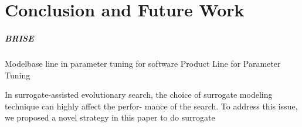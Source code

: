 \chapter{Conclusion and Future Work}\label{sec:conclusion}



         \paragraph{BRISE}
         Modelbase line in parameter tuning for software Product Line for Parameter Tuning




         In surrogate-assisted evolutionary search, the choice of surrogate modeling technique can highly affect the perfor- mance of the search. To address this issue, we proposed a novel strategy in this paper to do surrogate